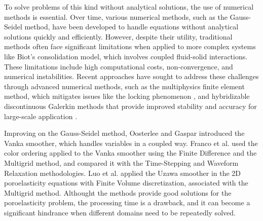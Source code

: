 \documentclass[sn-mathphys]{sn-jnl}%
\theoremstyle{thmstyleone}%
\theoremstyle{thmstyletwo}%
\theoremstyle{thmstylethree}%
\begin{document}

To solve problems of this kind without analytical solutions, the use of numerical methods is essential. Over time, various numerical methods, such as the Gauss-Seidel method, have been developed to handle equations without analytical solutions quickly and efficiently. However, despite their utility, traditional methods often face significant limitations when applied to more complex systems like Biot’s consolidation model, which involves coupled fluid-solid interactions. These limitations include high computational costs, non-convergence, and numerical instabilities. Recent approaches have sought to address these challenges through advanced numerical methods, such as the multiphysics finite element method, which mitigates issues like the locking phenomenon \cite{ge2022newmultiphysicsfiniteelement}, and hybridizable discontinuous Galerkin methods that provide improved stability and accuracy for large-scale application \cite{Cesmelioglu2023}.

Improving on the Gauss-Seidel method, Oosterlee and Gaspar \cite{oosterlee2008multigrid} introduced the Vanka smoother, which handles variables in a coupled way. Franco et al. \cite{franco2018multigrid} used the color ordering applied to the Vanka smoother using the Finite Difference and the Multigrid method, and compared it with the Time-Stepping and Waveform Relaxation methodologies. Luo et al. \cite{luo2017uzawa} applied the Uzawa smoother in the 2D poroelasticity equations with Finite Volume discretization, associated with the Multigrid method. Althought the methods provide good solutions for the poroelasticity problem, the processing time is a drawback, and it can become a significant hindrance when different domains need to be repeatedly solved.
\end{document}
